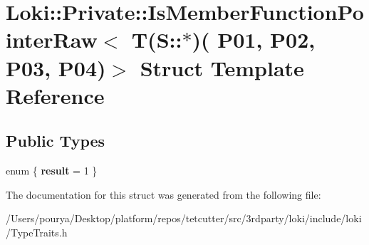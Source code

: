 \hypertarget{structLoki_1_1Private_1_1IsMemberFunctionPointerRaw_3_01T_07S_1_1_5_08_07_01_01_01_01_01_01_01_06946b9d888ef40dcc24847bd51cb0477}{}\section{Loki\+:\+:Private\+:\+:Is\+Member\+Function\+Pointer\+Raw$<$ T(S\+:\+:$\ast$)( P01, P02, P03, P04)$>$ Struct Template Reference}
\label{structLoki_1_1Private_1_1IsMemberFunctionPointerRaw_3_01T_07S_1_1_5_08_07_01_01_01_01_01_01_01_06946b9d888ef40dcc24847bd51cb0477}
\subsection*{Public Types}
\begin{DoxyCompactItemize}
\item 
\hypertarget{structLoki_1_1Private_1_1IsMemberFunctionPointerRaw_3_01T_07S_1_1_5_08_07_01_01_01_01_01_01_01_06946b9d888ef40dcc24847bd51cb0477_a4465569b70df7c0b71673d4c1ee26022}{}enum \{ {\bfseries result} = 1
 \}\label{structLoki_1_1Private_1_1IsMemberFunctionPointerRaw_3_01T_07S_1_1_5_08_07_01_01_01_01_01_01_01_06946b9d888ef40dcc24847bd51cb0477_a4465569b70df7c0b71673d4c1ee26022}

\end{DoxyCompactItemize}


The documentation for this struct was generated from the following file\+:\begin{DoxyCompactItemize}
\item 
/\+Users/pourya/\+Desktop/platform/repos/tetcutter/src/3rdparty/loki/include/loki/Type\+Traits.\+h\end{DoxyCompactItemize}
